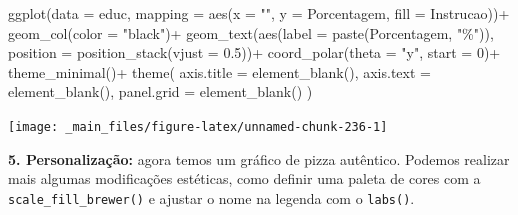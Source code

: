 \documentclass[
  brazilian,
]{book}
\newenvironment{Shaded}{\begin{snugshade}}{\end{snugshade}}
\newcommand{\AttributeTok}[1]{\textcolor[rgb]{0.77,0.63,0.00}{#1}}
\newcommand{\DecValTok}[1]{\textcolor[rgb]{0.00,0.00,0.81}{#1}}
\newcommand{\FloatTok}[1]{\textcolor[rgb]{0.00,0.00,0.81}{#1}}
\newcommand{\FunctionTok}[1]{\textcolor[rgb]{0.00,0.00,0.00}{#1}}
\newcommand{\NormalTok}[1]{#1}
\newcommand{\SpecialCharTok}[1]{\textcolor[rgb]{0.00,0.00,0.00}{#1}}
\newcommand{\StringTok}[1]{\textcolor[rgb]{0.31,0.60,0.02}{#1}}
\begin{document}
\begin{Shaded}
\begin{Highlighting}[]
\FunctionTok{ggplot}\NormalTok{(}\AttributeTok{data =}\NormalTok{ educ,}
       \AttributeTok{mapping =} \FunctionTok{aes}\NormalTok{(}\AttributeTok{x =} \StringTok{""}\NormalTok{,}
                     \AttributeTok{y =}\NormalTok{ Porcentagem,}
                     \AttributeTok{fill =}\NormalTok{ Instrucao))}\SpecialCharTok{+}
  \FunctionTok{geom\_col}\NormalTok{(}\AttributeTok{color =} \StringTok{"black"}\NormalTok{)}\SpecialCharTok{+}
  \FunctionTok{geom\_text}\NormalTok{(}\FunctionTok{aes}\NormalTok{(}\AttributeTok{label =} \FunctionTok{paste}\NormalTok{(Porcentagem, }\StringTok{"\%"}\NormalTok{)),}
            \AttributeTok{position =} \FunctionTok{position\_stack}\NormalTok{(}\AttributeTok{vjust =} \FloatTok{0.5}\NormalTok{))}\SpecialCharTok{+}
  \FunctionTok{coord\_polar}\NormalTok{(}\AttributeTok{theta =} \StringTok{"y"}\NormalTok{,}
              \AttributeTok{start =} \DecValTok{0}\NormalTok{)}\SpecialCharTok{+}
  \FunctionTok{theme\_minimal}\NormalTok{()}\SpecialCharTok{+}
  \FunctionTok{theme}\NormalTok{(}
    \AttributeTok{axis.title =} \FunctionTok{element\_blank}\NormalTok{(),}
    \AttributeTok{axis.text =} \FunctionTok{element\_blank}\NormalTok{(),}
    \AttributeTok{panel.grid =} \FunctionTok{element\_blank}\NormalTok{()}
\NormalTok{    )}
\end{Highlighting}
\end{Shaded}

\begin{center}\texttt{[image: \_main\_files/figure-latex/unnamed-chunk-236-1]} \end{center}

\textbf{5. Personalização:} agora temos um gráfico de pizza autêntico. Podemos realizar mais algumas modificações estéticas, como definir uma paleta de cores com a \texttt{scale\_fill\_brewer()} e ajustar o nome na legenda com o \texttt{labs()}.
\end{document}
